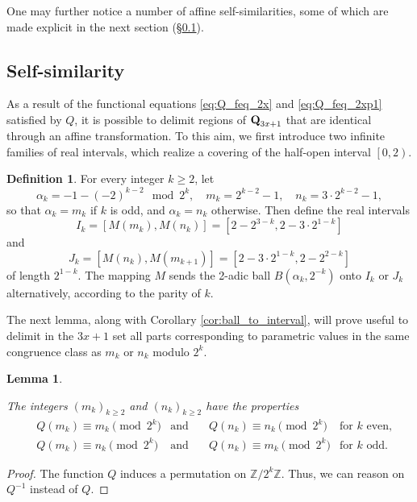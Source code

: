 \documentclass[12pt]{article}
\newtheorem{lemma}{Lemma}
\theoremstyle{definition}
\newtheorem{definition}{Definition}
\newcommand{\Qset}{\normalfont \textbf{Q}_{3x+1}}
\begin{document}
{{One may further notice a number of affine self-similarities, some of which are made explicit in the next section (\S\ref{sub:autosim}).

\subsection{Self-similarity}
\label{sub:autosim}

As a result of the functional equations \eqref{eq:Q_feq_2x} and \eqref{eq:Q_feq_2xp1} satisfied by $Q$, it is possible to delimit regions of $\Qset$ that are identical through an affine transformation. To this aim, we first introduce two infinite families of real intervals, which realize a covering of the half-open interval $\left[  0, 2 \right) $.
\begin{definition} \label{def:IJ}
For every integer $k \geq 2$, let
$$ \alpha_k = -1 - (-2)^{k-2} \mod 2^{k}, \quad m_k = 2^{k-2} - 1, \quad n_k = 3 \cdot 2^{k-2} -1,$$
so that $\alpha_k = m_k$ if $k$ is odd, and $\alpha_k = n_k$ otherwise. Then define the real intervals
$$ I_k = \left[  M(m_k), M(n_k) \right]  = \left[  2 - 2^{3-k}, 2 - 3\cdot 2^{1-k}\right] $$
and
$$ J_k = \left[  M(n_k), M(m_{k+1}) \right]  = \left[  2 - 3\cdot 2^{1-k}, 2 - 2^{2-k}\right]$$
of length $2^{1-k}$. The mapping $M$ sends the 2-adic ball $B(\alpha_k,2^{-k})$ onto $I_k$ or $J_k$ alternatively, according to the parity of $k$.
\end{definition}

The next lemma, along with Corollary \ref{cor:ball_to_interval}, will prove useful to delimit in the $3x+1$ set all parts corresponding to parametric values in the same congruence class as $m_k$ or $n_k$ modulo $2^k$.
\begin{lemma}
\label{lem:mk_nk}

The integers $(m_k)_{k\geq2}$ and $(n_k)_{k\geq2}$ have the properties
\begin{align}
 &Q(m_k) \equiv m_k \pmod{2^k}  &\text{and} \quad &Q(n_k) \equiv n_k \pmod{2^k} & \text{for $k$ even,} \label{eq:mnk_even} \\
 &Q(m_k) \equiv n_k \pmod{2^k}  &\text{and} \quad &Q(n_k) \equiv m_k \pmod{2^k} & \text{for $k$ odd.} \label{eq:mnk_odd}
\end{align}
\end{lemma}

\begin{proof}The function $Q$ induces a permutation on $\mathbb{Z}/2^k\mathbb{Z}$. Thus, we can reason on $Q^{-1}$ instead of $Q$.


\end{proof}}}
\end{document}
